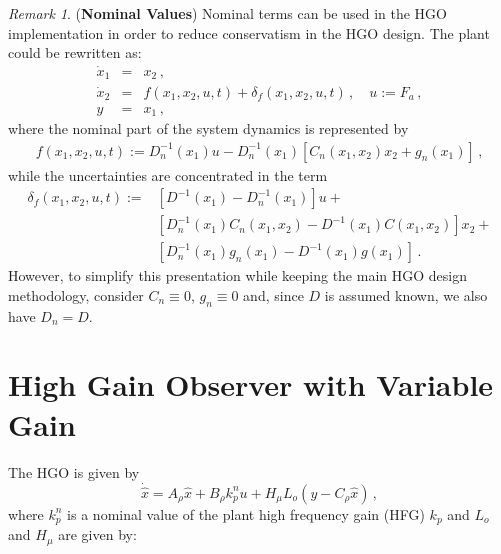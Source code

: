 \documentclass[letterpaper, 10 pt, journal, twocolumn]{IEEEtran}  %
\theoremstyle{plain}
\theoremstyle{definition}
\theoremstyle{remark}
\newtheorem*{remark}{Remark}
\begin{document}
 
\begin{remark}({\bf Nominal Values})
Nominal terms can be used in the HGO implementation in order to reduce conservatism in the HGO design. The plant could be rewritten as:
%
\begin{eqnarray}
\dot{x}_1&=& x_2\,, \\
\dot{x}_2 &=& f(x_1,x_2,u,t) + \delta_f(x_1,x_2,u,t)\,, \quad u:=F_a\,,\\
y &=&  x_1\,,
\end{eqnarray}
%
where the nominal part of the system dynamics is represented by
%
%
\begin{eqnarray}
f(x_1,x_2,u,t):=D_n^{-1}(x_1) u - D_n^{-1}(x_1) \left[ C_n(x_1,x_2) x_2+g_n(x_1)\right]\,,
\end{eqnarray}
%
while the uncertainties are concentrated in the term 
%
\begin{equation}
	\begin{split}
		\delta_f(x_1,x_2,u,t)\!\! := \!\!&\left[D^{-1}(x_1)-D_n^{-1}(x_1)\right]  u + \\
		&\left[D_n^{-1}(x_1)C_n(x_1,x_2) - D^{-1}(x_1)C(x_1,x_2)\right] x_2 + \\
		&\left[D_n^{-1}(x_1)g_n(x_1) - D^{-1}(x_1)g(x_1)\right]\,.
	\end{split}
\end{equation}
%
However, to simplify this presentation while keeping the main HGO design methodology, consider $C_n \equiv 0$, $g_n \equiv 0$ and, since $D$ is assumed known, we also have $D_n=D$.
\end{remark}





\section{High Gain Observer with Variable Gain}
\label{sec:HGO}

The HGO \cite{Khalil2008} is given by
%
\begin{equation}
\dot{\hat{x}}=A_\rho \hat{x} +  B_\rho k_p^n u +H_\mu L_o (y-C_\rho
\hat{x})\,,\label{eq:reducedHGO}
\end{equation}
%
where $k_p^n$ is a nominal value of the plant high frequency gain (HFG) $k_p$ and $L_o$ and $H_\mu$ are given by:
\end{document}
